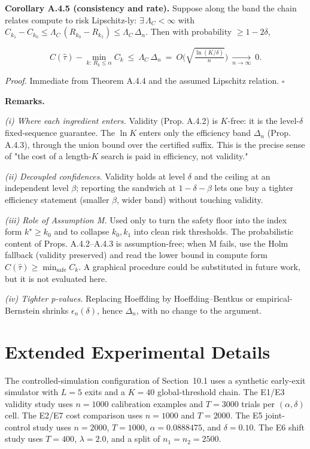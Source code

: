 \documentclass{ieeeaccess}
\begin{document}
\textbf{Corollary A.4.5 (consistency and rate).} Suppose along the band the chain relates compute to risk Lipschitz-ly: $\exists\,\Lambda_C<\infty$ with $C_{k_1}-C_{k_0}\le\Lambda_C\,(R_{k_0}-R_{k_1})\le\Lambda_C\,\Delta_n$. Then with probability $\ge1-2\delta$,

\[
C(\hat\tau)-\min_{k:\,R_k\le\alpha}C_k\ \le\ \Lambda_C\,\Delta_n\ =\ O\!\Big(\sqrt{\tfrac{\ln(K/\delta)}{n}}\Big)\ \xrightarrow[n\to\infty]{}\ 0 .
\]

\emph{Proof.} Immediate from Theorem A.4.4 and the assumed Lipschitz relation. $\square$

\textbf{Remarks.}

\emph{(i) Where each ingredient enters.} Validity (Prop. A.4.2) is $K$-free: it is the level-$\delta$ fixed-sequence guarantee. The $\ln K$ enters only the efficiency band $\Delta_n$ (Prop. A.4.3), through the union bound over the certified suffix. This is the precise sense of "the cost of a length-$K$ search is paid in efficiency, not validity."

\emph{(ii) Decoupled confidences.} Validity holds at level $\delta$ and the ceiling at an independent level $\beta$; reporting the sandwich at $1-\delta-\beta$ lets one buy a tighter efficiency statement (smaller $\beta$, wider band) without touching validity.

\emph{(iii) Role of Assumption M.} Used only to turn the safety floor into the index form $k^\star\ge k_0$ and to collapse $k_0,k_1$ into clean risk thresholds. The probabilistic content of Props. A.4.2--A.4.3 is assumption-free; when M fails, use the Holm fallback (validity preserved) and read the lower bound in compute form $C(\hat\tau)\ge\min_{\text{safe}}C_k$. A graphical procedure could be substituted in future work, but it is not evaluated here.

\emph{(iv) Tighter p-values.} Replacing Hoeffding by Hoeffding--Bentkus or empirical-Bernstein shrinks $\epsilon_n(\delta)$, hence $\Delta_n$, with no change to the argument.

\section{Extended Experimental Details}

The controlled-simulation configuration of Section~10.1 uses a synthetic early-exit simulator with $L=5$ exits and a $K=40$ global-threshold chain. The E1/E3 validity study uses $n=1000$ calibration examples and $T=3000$ trials per $(\alpha,\delta)$ cell. The E2/E7 cost comparison uses $n=1000$ and $T=2000$. The E5 joint-control study uses $n=2000$, $T=1000$, $\alpha=0.0888475$, and $\delta=0.10$. The E6 shift study uses $T=400$, $\lambda=2.0$, and a split of $n_1=n_2=2500$.
\end{document}
